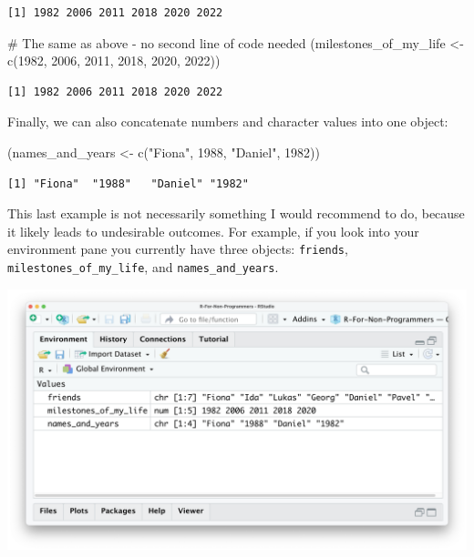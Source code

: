 \documentclass[
  letterpaper,
  DIV=11,
  numbers=noendperiod]{scrreprt}
\newenvironment{Shaded}{\begin{snugshade}}{\end{snugshade}}
\newcommand{\CommentTok}[1]{\textcolor[rgb]{0.37,0.37,0.37}{#1}}
\newcommand{\DecValTok}[1]{\textcolor[rgb]{0.68,0.00,0.00}{#1}}
\newcommand{\FunctionTok}[1]{\textcolor[rgb]{0.28,0.35,0.67}{#1}}
\newcommand{\NormalTok}[1]{\textcolor[rgb]{0.00,0.23,0.31}{#1}}
\newcommand{\OtherTok}[1]{\textcolor[rgb]{0.00,0.23,0.31}{#1}}
\newcommand{\StringTok}[1]{\textcolor[rgb]{0.13,0.47,0.30}{#1}}
\begin{document}
\begin{verbatim}
[1] 1982 2006 2011 2018 2020 2022
\end{verbatim}

\begin{Shaded}
\begin{Highlighting}[]
\CommentTok{\# The same as above {-} no second line of code needed}
\NormalTok{(milestones\_of\_my\_life }\OtherTok{\textless{}{-}} \FunctionTok{c}\NormalTok{(}\DecValTok{1982}\NormalTok{, }\DecValTok{2006}\NormalTok{, }\DecValTok{2011}\NormalTok{, }\DecValTok{2018}\NormalTok{, }\DecValTok{2020}\NormalTok{, }\DecValTok{2022}\NormalTok{))}
\end{Highlighting}
\end{Shaded}

\begin{verbatim}
[1] 1982 2006 2011 2018 2020 2022
\end{verbatim}

Finally, we can also concatenate numbers and character values into one
object:

\begin{Shaded}
\begin{Highlighting}[]
\NormalTok{(names\_and\_years }\OtherTok{\textless{}{-}} \FunctionTok{c}\NormalTok{(}\StringTok{"Fiona"}\NormalTok{, }\DecValTok{1988}\NormalTok{, }\StringTok{"Daniel"}\NormalTok{, }\DecValTok{1982}\NormalTok{))}
\end{Highlighting}
\end{Shaded}

\begin{verbatim}
[1] "Fiona"  "1988"   "Daniel" "1982"  
\end{verbatim}

This last example is not necessarily something I would recommend to do,
because it likely leads to undesirable outcomes. For example, if you
look into your environment pane you currently have three objects:
\texttt{friends}, \texttt{milestones\_of\_my\_life}, and
\texttt{names\_and\_years}.

\includegraphics{images/chapter_05_img/01_basic_computation_environment_objects.png}
\end{document}
